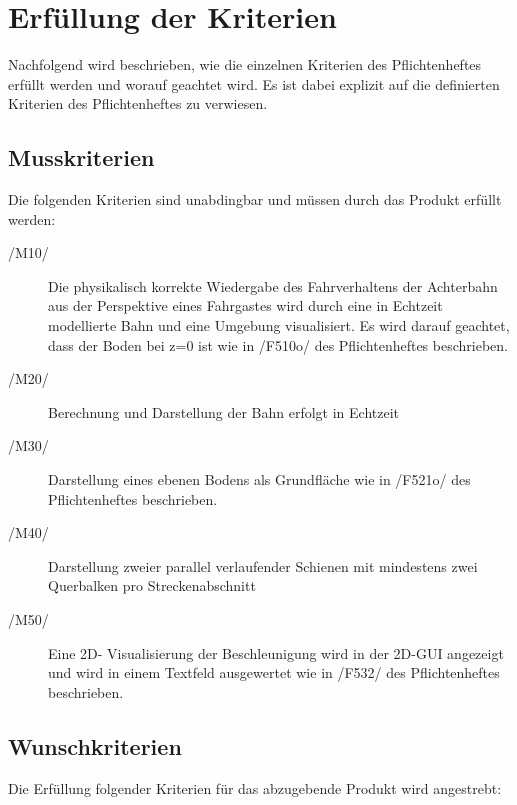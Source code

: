 \chapter{Erfüllung der Kriterien}

Nachfolgend wird beschrieben, wie die einzelnen Kriterien des Pflichtenheftes
erfüllt werden und worauf geachtet wird.  Es ist dabei explizit auf die
definierten Kriterien des Pflichtenheftes zu verwiesen.
\section{Musskriterien}

Die folgenden Kriterien sind unabdingbar und müssen durch das Produkt erfüllt
werden:
\begin{description}
	\item[/M10/] Die physikalisch korrekte Wiedergabe des Fahrverhaltens der Achterbahn aus der Perspektive eines Fahrgastes wird durch eine in Echtzeit modellierte Bahn und eine Umgebung visualisiert. Es wird darauf geachtet, dass der Boden bei z=0 ist wie in /F510o/ des Pflichtenheftes beschrieben.
	\item[/M20/] Berechnung und Darstellung der Bahn erfolgt in Echtzeit
	\item[/M30/] Darstellung eines ebenen Bodens als Grundfläche wie in /F521o/ des Pflichtenheftes beschrieben.
	\item[/M40/] Darstellung zweier parallel verlaufender Schienen mit mindestens zwei Querbalken pro Streckenabschnitt
	\item[/M50/] Eine 2D- Visualisierung der Beschleunigung wird in der 2D-GUI angezeigt und wird in einem Textfeld ausgewertet wie in /F532/ des Pflichtenheftes beschrieben.
\end{description}

\section{Wunschkriterien}
Die Erfüllung folgender Kriterien für das abzugebende Produkt wird angestrebt:


